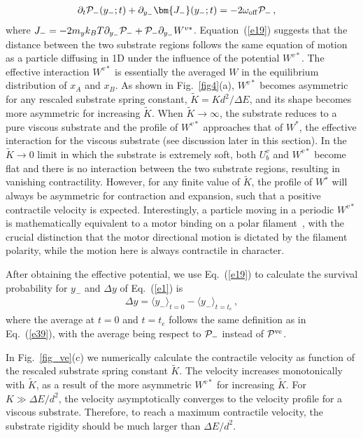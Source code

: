 \documentclass[twocolumn,prl,english]{revtex4-1}
\begin{document}
\begin{align}
&\partial_t {\cal P}_{-}( y_-;t)+\partial_{y_-} {\bm {J_-}( y_-;t)}= - 2\omega_{\rm off}{\cal P}_-\,,\label{e19}
\end{align}
where $J_- = -2m_yk_B T\partial_{ y_-} {\cal P}_-+{\cal P}_{-}\partial_{y_-} W^{v*} $. Equation~(\ref{e19}) suggests that the distance between the two substrate regions follows the same equation of motion as a particle diffusing in 1D under the influence of the potential $W^{v*}$. The effective interaction $W^{v*}$ is essentially the averaged $W$ in the equilibrium distribution of $x_A$ and $x_B$. As shown in Fig.~\ref{fig4}(a), $W^{v*}$ becomes asymmetric for any rescaled substrate spring constant, $\tilde K= K d^2/\Delta E$, and its shape becomes more asymmetric for increasing $\tilde K$. When $\tilde K\to\infty$, the substrate reduces to a pure viscous substrate and the profile of $W^{v*}$ approaches that of $W^*$, the effective interaction for the viscous substrate (see discussion later in this section). In the $\tilde K\to 0$ limit in which the substrate is extremely soft, both $U_b^v$ and $W^{v*}$ become flat and there is no interaction between the two substrate regions,  resulting in vanishing contractility. However, for any finite value of $\tilde K$, the profile of $W{^*}$ will always be asymmetric for contraction and expansion, such that a positive contractile velocity is expected. Interestingly, a particle moving in a periodic $W^{v*}$ is mathematically equivalent to a motor binding on a polar filament~\cite{Julicher1997}, 
with the crucial distinction that the motor directional motion is dictated by the filament polarity, while the motion here is always contractile in character. 


After obtaining the effective potential, we use Eq.~(\ref{e19}) to calculate the survival probability for $y_-$ and $\Delta y$ of Eq.~(\ref{e1}) is
\begin{equation}
\begin{aligned}
\Delta y  =  \langle y_-\rangle _{t=0}-\langle y_-\rangle _{t=t_e}\,,
\end{aligned}
\label{e20}
\end{equation}
where the average at $t=0$ and $t=t_e$ follows the same definition as in  Eq.~(\ref{e39}), with the average being respect to ${\cal P}_-$ instead of ${\cal P}^{\rm ve}$. 


In Fig.~\ref{fig_ve}(c) we numerically calculate the contractile velocity as function of the rescaled substrate spring constant $\tilde K $. The velocity increases monotonically with $\tilde K$, as a result of the more asymmetric $W^{v*}$ for increasing $\tilde K$. For $K\gg \Delta E/d^2$, the velocity asymptotically converges to the velocity profile for a viscous substrate. Therefore, to reach a maximum contractile velocity, the substrate rigidity should be much larger than $ \Delta E/d^2$. 
\end{document}
